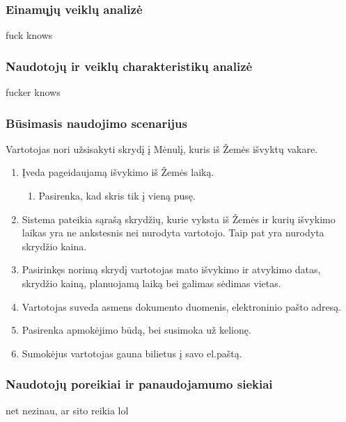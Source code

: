 \documentclass{VUMIFPSkursinis}
\begin{document}
\subsubsection{Einamųjų veiklų analizė}
fuck knows
\subsubsection{Naudotojų ir veiklų charakteristikų analizė}
fucker knows
\subsubsection{Būsimasis naudojimo scenarijus}
Vartotojas nori užsisakyti skrydį į Mėnulį, kuris iš Žemės išvyktų vakare.
\begin{enumerate}
\item Įveda pageidaujamą išvykimo iš Žemės laiką.
\begin{enumerate}[label*=\arabic*.]
\item Pasirenka, kad skris tik į vieną pusę.
\end{enumerate}
\item Sistema pateikia sąrašą skrydžių, kurie vyksta iš Žemės ir kurių išvykimo laikas yra ne ankstesnis nei nurodyta vartotojo. Taip pat yra nurodyta skrydžio kaina.
\item Pasirinkęs norimą skrydį vartotojas mato išvykimo ir atvykimo datas, skrydžio kainą, planuojamą laiką bei galimas sėdimas vietas.
\item Vartotojas suveda asmens dokumento duomenis, elektroninio pašto adresą.
\item Pasirenka apmokėjimo būdą, bei susimoka už kelionę.
\item Sumokėjus vartotojas gauna bilietus į savo el.paštą.
\end{enumerate}
\subsubsection{Naudotojų poreikiai ir panaudojamumo siekiai}
net nezinau, ar sito reikia lol


\printbibliography[heading=bibintoc, title=Šaltiniai]  %
\end{document}
